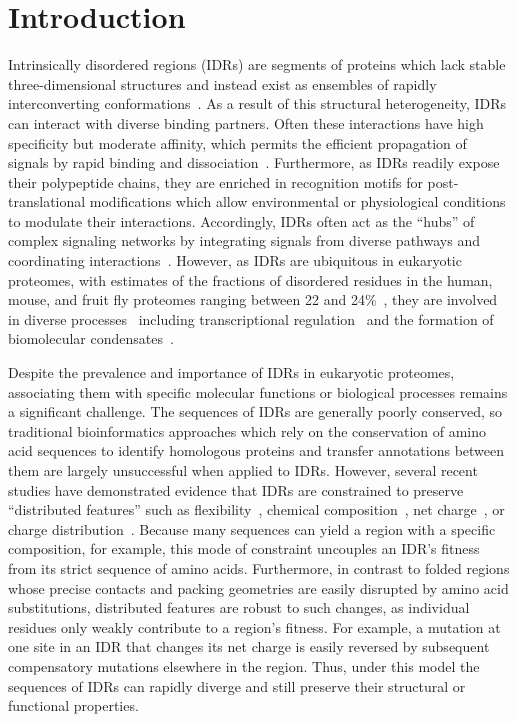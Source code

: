 \section{Introduction}
Intrinsically disordered regions (IDRs) are segments of proteins which lack stable three-dimensional structures and instead exist as ensembles of rapidly interconverting conformations~\cite{Holehouse2023}. As a result of this structural heterogeneity, IDRs can interact with diverse binding partners. Often these interactions have high specificity but moderate affinity, which permits the efficient propagation of signals by rapid binding and dissociation~\cite{Zhou2012, Wright2014}. Furthermore, as IDRs readily expose their polypeptide chains, they are enriched in recognition motifs for post-translational modifications which allow environmental or physiological conditions to modulate their interactions. Accordingly, IDRs often act as the ``hubs'' of complex signaling networks by integrating signals from diverse pathways and coordinating interactions~\cite{Dunker2005, Buljan2012}. However, as IDRs are ubiquitous in eukaryotic proteomes, with estimates of the fractions of disordered residues in the human, mouse, and fruit fly proteomes ranging between 22 and 24\%~\cite{Piovesan2020, Piovesan2022}, they are involved in diverse processes~\cite{vanderLee2014} including transcriptional regulation~\cite{Liu2006} and the formation of biomolecular condensates~\cite{Banani2017}.

Despite the prevalence and importance of IDRs in eukaryotic proteomes, associating them with specific molecular functions or biological processes remains a significant challenge. The sequences of IDRs are generally poorly conserved, so traditional bioinformatics approaches which rely on the conservation of amino acid sequences to identify homologous proteins and transfer annotations between them are largely unsuccessful when applied to IDRs. However, several recent studies have demonstrated evidence that IDRs are constrained to preserve ``distributed features'' such as flexibility~\cite{Daughdrill2007}, chemical composition~\cite{Moesa2012}, net charge~\cite{Zarin2017}, or charge distribution~\cite{Beh2012, Sherry2017}. Because many sequences can yield a region with a specific composition, for example, this mode of constraint uncouples an IDR's fitness from its strict sequence of amino acids. Furthermore, in contrast to folded regions whose precise contacts and packing geometries are easily disrupted by amino acid substitutions, distributed features are robust to such changes, as individual residues only weakly contribute to a region's fitness. For example, a mutation at one site in an IDR that changes its net charge is easily reversed by subsequent compensatory mutations elsewhere in the region. Thus, under this model the sequences of IDRs can rapidly diverge and still preserve their structural or functional properties.

